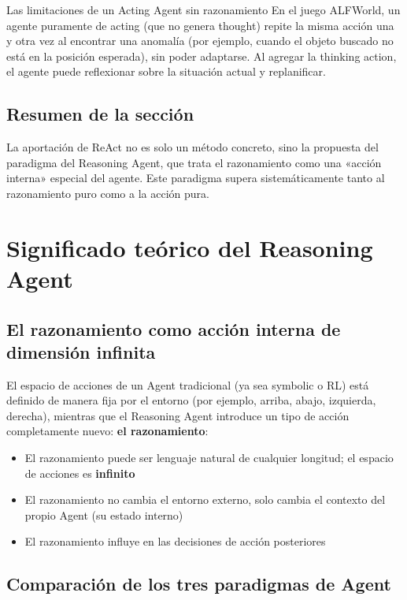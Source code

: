 \documentclass[a4paper]{article}
\begin{document}
\begin{warningbox}{Las limitaciones de un Acting Agent sin razonamiento}
En el juego ALFWorld, un agente puramente de acting (que no genera thought) repite la misma acción una y otra vez al encontrar una anomalía (por ejemplo, cuando el objeto buscado no está en la posición esperada), sin poder adaptarse. Al agregar la thinking action, el agente puede reflexionar sobre la situación actual y replanificar.
\end{warningbox}

\subsection{Resumen de la sección}

La aportación de ReAct no es solo un método concreto, sino la propuesta del paradigma del Reasoning Agent, que trata el razonamiento como una «acción interna» especial del agente. Este paradigma supera sistemáticamente tanto al razonamiento puro como a la acción pura.

\section{Significado teórico del Reasoning Agent}

\subsection{El razonamiento como acción interna de dimensión infinita}

El espacio de acciones de un Agent tradicional (ya sea symbolic o RL) está definido de manera fija por el entorno (por ejemplo, arriba, abajo, izquierda, derecha), mientras que el Reasoning Agent introduce un tipo de acción completamente nuevo: \textbf{el razonamiento}:

\begin{itemize}
    \item El razonamiento puede ser lenguaje natural de cualquier longitud; el espacio de acciones es \textbf{infinito}
    \item El razonamiento no cambia el entorno externo, solo cambia el contexto del propio Agent (su estado interno)
    \item El razonamiento influye en las decisiones de acción posteriores
\end{itemize}

\subsection{Comparación de los tres paradigmas de Agent}
\end{document}
